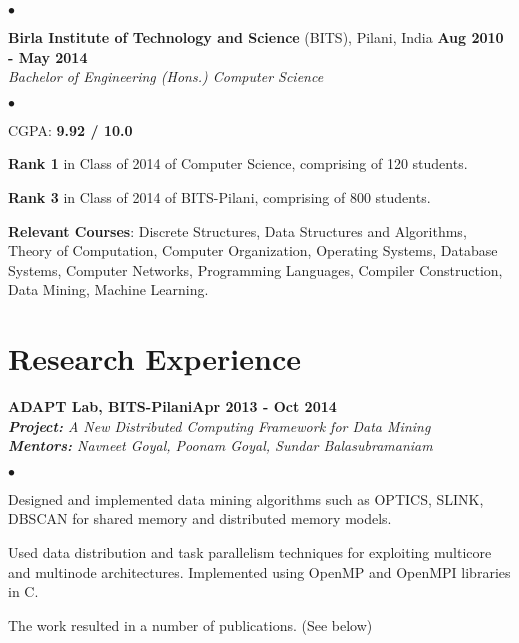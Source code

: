 \documentclass[margin,line]{res}
\newenvironment{list2}{
  \begin{list}{$\bullet$}{%
      \setlength{\itemsep}{0in}
      \setlength{\parsep}{0in} \setlength{\parskip}{0in}
      \setlength{\topsep}{0in} \setlength{\partopsep}{0in} 
      \setlength{\leftmargin}{0.2in}}}{\end{list}}
\begin{document}
\begin{resume}
\begin{list2}
\end{list2}
{\bf Birla Institute of Technology and Science} (BITS), Pilani, India \hfill {\bf {Aug 2010 - May 2014}}\\
{\em Bachelor of Engineering (Hons.) Computer Science }
\vspace*{.3cm}
\begin{list2}
\item CGPA:  {\bf {9.92 / 10.0}}
\item {\bf Rank 1} in Class of 2014 of Computer Science, comprising of 120 students. 
\item {\bf Rank 3} in Class of 2014 of BITS-Pilani, comprising of 800 students.
\item {\bf Relevant Courses}: Discrete Structures, Data Structures and Algorithms, Theory of Computation, Computer Organization, Operating Systems, Database Systems, Computer Networks, Programming Languages, Compiler Construction, Data Mining, Machine Learning.

\end{list2}


\section{\sc Research Experience}



{\bf ADAPT Lab, BITS-Pilani}\hfill {\bf Apr 2013 - Oct 2014}\\
{\em {\bf Project:} A New Distributed Computing Framework for Data Mining} \\
{\em {\bf Mentors:} Navneet Goyal, Poonam Goyal, Sundar Balasubramaniam}
\vspace{.3cm}
\begin{list2}
\item Designed and implemented data mining algorithms such as OPTICS, SLINK, DBSCAN for shared memory and
distributed memory models.
\item Used data distribution and task parallelism techniques for exploiting multicore and multinode
architectures. Implemented using OpenMP and OpenMPI libraries in C.
\item The work resulted in a number of publications. (See below)
\end{list2}


\end{resume}
\end{document}
